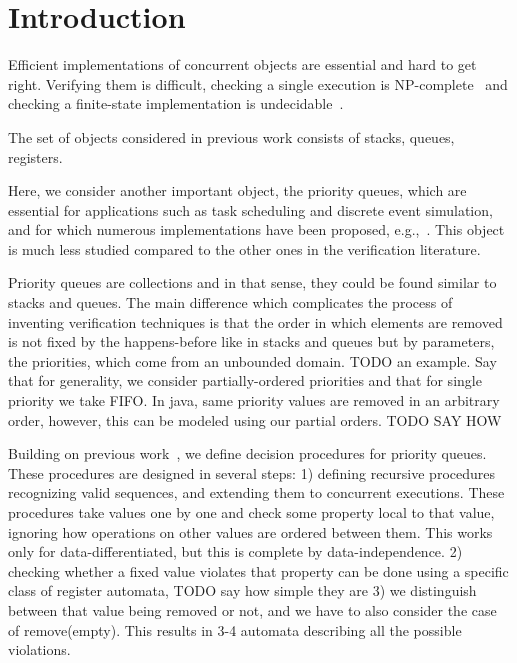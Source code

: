 \section{Introduction}
\label{sec:introduction}

Efficient implementations of concurrent objects are essential and hard to get right. Verifying them is difficult, checking a single execution is NP-complete~\cite{journals/siamcomp/GibbonsK97} and checking a finite-state implementation is undecidable~\cite{conf/esop/BouajjaniEEH13}.

The set of objects considered in previous work consists of stacks, queues, registers.



Here, we consider another important object, the priority queues, which are essential for applications such as task scheduling and discrete event simulation, and for which numerous implementations have been proposed, e.g.,~\cite{DBLP:conf/ppopp/AlistarhKLS15,DBLP:conf/wdag/CalciuMH14,DBLP:conf/opodis/LindenJ13,DBLP:conf/podc/ShavitZ99,DBLP:conf/ipps/ShavitL00}. This object is much less studied compared to the other ones in the verification literature.

Priority queues are collections and in that sense, they could be found similar to stacks and queues. The main difference which complicates the process of inventing verification techniques is that the order in which elements are removed is not fixed by the happens-before like in stacks and queues but by parameters, the priorities, which come from an unbounded domain. TODO an example. Say that for generality, we consider partially-ordered priorities and that for single priority we take FIFO. In java, same priority values are removed in an arbitrary order, however, this can be modeled using our partial orders. TODO SAY HOW

Building on previous work~\cite{DBLP:conf/icalp/BouajjaniEEH15}, we define decision procedures for priority queues. These procedures are designed in several steps:
1) defining recursive procedures recognizing valid sequences, and extending them to concurrent executions. These procedures take values one by one and check some property local to that value, ignoring how operations on other values are ordered between them. This works only for data-differentiated, but this is complete by data-independence.
2) checking whether a fixed value violates that property can be done using a specific class of register automata, TODO say how simple they are
3) we distinguish between that value being removed or not, and we have to also consider the case of remove(empty). This results in 3-4 automata describing all the possible violations.

